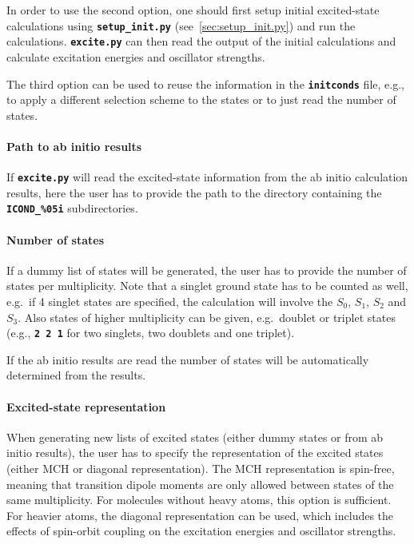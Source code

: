 \documentclass[a4paper,10pt,DIV=15,openany,twoside=false]{scrbook}
\newcommand{\ttt}[1]{\textbf{\texttt{#1}}}
\begin{document}
In order to use the second option, one should first setup initial excited-state calculations using \ttt{setup\_init.py} (see~\ref{sec:setup_init.py}) and run the calculations. \ttt{excite.py} can then read the output of the initial calculations and calculate excitation energies and oscillator strengths.

The third option can be used to reuse the information in the \ttt{initconds} file, e.g., to apply a different selection scheme to the states or to just read the number of states.

\paragraph{Path to ab initio results}

If \ttt{excite.py} will read the excited-state information from the ab initio calculation results, here the user has to provide the path to the directory containing the \ttt{ICOND\_\%05i} subdirectories.

\paragraph{Number of states}

If a dummy list of states will be generated, the user has to provide the number of states per multiplicity. Note that a singlet ground state has to be counted as well, e.g.\ if 4 singlet states are specified, the calculation will involve the $S_0$, $S_1$, $S_2$ and $S_3$. Also states of higher multiplicity can be given, e.g.\ doublet or triplet states (e.g., \ttt{2 2 1} for two singlets, two doublets and one triplet).

If the ab initio results are read the number of states will be automatically determined from the results.

\paragraph{Excited-state representation}

When generating new lists of excited states (either dummy states or from ab initio results), the user has to specify the representation of the excited states (either MCH or diagonal representation). The MCH representation is spin-free, meaning that transition dipole moments are only allowed between states of the same multiplicity. For molecules without heavy atoms, this option is sufficient. For heavier atoms, the diagonal representation can be used, which includes the effects of spin-orbit coupling on the excitation energies and oscillator strengths. 
\end{document}
